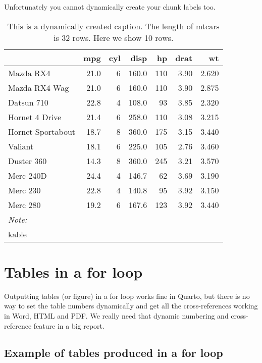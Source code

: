 \documentclass[
  letterpaper,
  oneside]{scrbook}
\begin{document}
Unfortunately you cannot dynamically create your chunk labels too.

\hypertarget{tbl-test3}{}
\begin{table}
\caption{\label{tbl-test3}This is a dynamically created caption. The length of mtcars is 32 rows.
Here we show 10 rows. }\tabularnewline

\centering
\begin{tabular}[t]{lrrrrrr}
\toprule
  & mpg & cyl & disp & hp & drat & wt\\
\midrule
Mazda RX4 & 21.0 & 6 & 160.0 & 110 & 3.90 & 2.620\\
Mazda RX4 Wag & 21.0 & 6 & 160.0 & 110 & 3.90 & 2.875\\
Datsun 710 & 22.8 & 4 & 108.0 & 93 & 3.85 & 2.320\\
Hornet 4 Drive & 21.4 & 6 & 258.0 & 110 & 3.08 & 3.215\\
Hornet Sportabout & 18.7 & 8 & 360.0 & 175 & 3.15 & 3.440\\
\addlinespace
Valiant & 18.1 & 6 & 225.0 & 105 & 2.76 & 3.460\\
Duster 360 & 14.3 & 8 & 360.0 & 245 & 3.21 & 3.570\\
Merc 240D & 24.4 & 4 & 146.7 & 62 & 3.69 & 3.190\\
Merc 230 & 22.8 & 4 & 140.8 & 95 & 3.92 & 3.150\\
Merc 280 & 19.2 & 6 & 167.6 & 123 & 3.92 & 3.440\\
\bottomrule
\multicolumn{7}{l}{\rule{0pt}{1em}\textit{Note: }}\\
\multicolumn{7}{l}{\rule{0pt}{1em}kable}\\
\end{tabular}
\end{table}


\hypertarget{tables-in-a-for-loop}{%
\chapter{Tables in a for loop}\label{tables-in-a-for-loop}}

Outputting tables (or figure) in a for loop works fine in Quarto, but
there is no way to set the table numbers dynamically and get all the
cross-references working in Word, HTML and PDF. We really need that
dynamic numbering and cross-reference feature in a big report.

\hypertarget{example-of-tables-produced-in-a-for-loop}{%
\section{Example of tables produced in a for
loop}\label{example-of-tables-produced-in-a-for-loop}}
\end{document}
